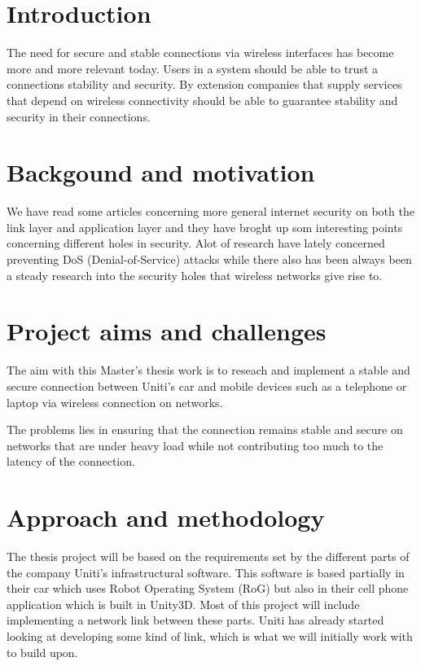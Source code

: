 \documentclass[a4paper]{article}
\begin{document}
\section{Introduction}
The need for secure and stable connections via wireless interfaces has become
more and more relevant today.  Users in a system should be able to trust a
connections stability and security. By extension companies that supply services
that depend on wireless connectivity should be able to guarantee stability
and security in their connections.


\section{Backgound and motivation}

We have read some articles\cite{NIST_report} concerning more general
internet security on both the link layer and application layer and
they have broght up som interesting points concerning different holes
in security. Alot of research have lately concerned preventing 
DoS (Denial-of-Service) attacks while there also has been always been a
steady research into the security holes that wireless networks give rise to. 


\section{Project aims and challenges}

The aim with this Master's thesis work is to reseach and implement a stable and
secure connection between Uniti's car and mobile devices such as a telephone or
laptop via wireless connection on networks.

The problems lies in ensuring that the connection remains stable and secure on
networks that are under heavy load while not contributing too much to the
latency of the connection.

\section{Approach and methodology}
The thesis project will be based on the requirements set by the different parts
of the company Uniti's infrastructural software. This software is based
partially in their car which uses Robot Operating System (RoG) but also in
their cell phone application which is built in Unity3D. Most of this project
will include implementing a network link between these parts. Uniti has
already started looking at developing some kind of link, which is what
we will initially work with to build upon.
\end{document}
